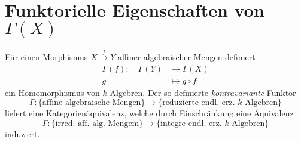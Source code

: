 
\section{Funktorielle Eigenschaften von $\Gamma(X)$}
\label{sec:koordinatenring-funktiorialitaet}
\begin{prop}
  \label{prop:koordinatenringfunktor}
  Für einen Morphismus $X\xrightarrow{f}Y$ affiner algebraischer Mengen
  definiert 
  \begin{align*}
    \Gamma(f):\quad\Gamma(Y) & \rightarrow\Gamma(X)\\
    g & \mapsto g\circ f
  \end{align*}
  ein Homomorphismus von $k$-Algebren. Der so definierte \emph{kontravariante}
  Funktor
  \[
    \Gamma:\{\text{affine algebraische Mengen}\}\rightarrow\{\text{reduzierte endl. erz. }k\text{-Algebren}\}
  \]
  liefert eine Kategorienäquivalenz, welche durch Einschränkung eine Äquivalenz
  \[
    \Gamma:\{\text{irred. aff. alg. Mengem\}}\rightarrow\{\text{integre endl. erz. }k\text{-Algebren\}}
  \]
  induziert.
\end{prop}
